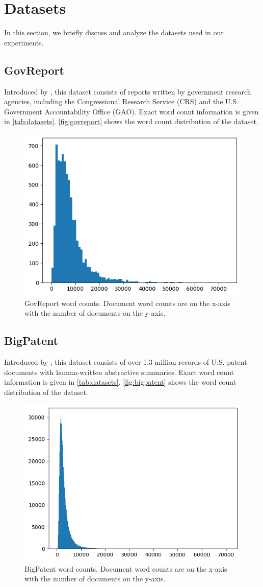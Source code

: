 \section{Datasets}
\label{sec:datasets}

In this section, we briefly discuss and analyze the datasets used in our experiments.


\subsection*{GovReport}

Introduced by \citet{huang-etal-2021-efficient}, this dataset consists of reports written by government research agencies, including the Congressional Research Service (CRS) and the U.S. Government Accountability Office (GAO).
Exact word count information is given in \autoref{tab:datasets}.
\autoref{fig:govreport} shows the word count distribution of the dataset.

\begin{figure}[!ht]
  \centering
  \includegraphics[width=.48\textwidth]{images/govreport-wordcount.png}
  \caption{
    GovReport word counts.
    Document word counts are on the x-axis with the number of documents on the y-axis.
  }
  \label{fig:govreport}
\end{figure}


\subsection*{BigPatent}

Introduced by \citet{sharma-etal-2019-bigpatent}, this dataset consists of over 1.3 million records of U.S. patent documents with human-written abstractive summaries.
Exact word count information is given in \autoref{tab:datasets}.
\autoref{fig:bigpatent} shows the word count distribution of the dataset.

\begin{figure}[!ht]
  \centering
  \includegraphics[width=.48\textwidth]{images/bigpatent-wordcount.png}
  \caption{
    BigPatent word counts.
    Document word counts are on the x-axis with the number of documents on the y-axis.
  }
  \label{fig:bigpatent}
\end{figure}


